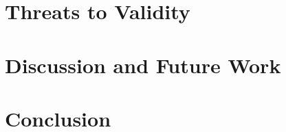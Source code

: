\section{Threats to Validity}\label{sec:validity}

\section{Discussion and Future Work}\label{sec:discussion}


\section{Conclusion}\label{sec:conclusion}
